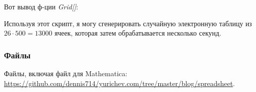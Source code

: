 Вот вывод ф-ции \textit{Grid[]}:



Используя этот скрипт, я могу сгенерировать случайную электронную таблицу из $26 \cdot 500=13000$ ячеек,
которая затем обрабатывается несколько секунд.

\subsubsection{Файлы}

Файлы, включая файл для Mathematica: \url{https://github.com/dennis714/yurichev.com/tree/master/blog/spreadsheet}.


